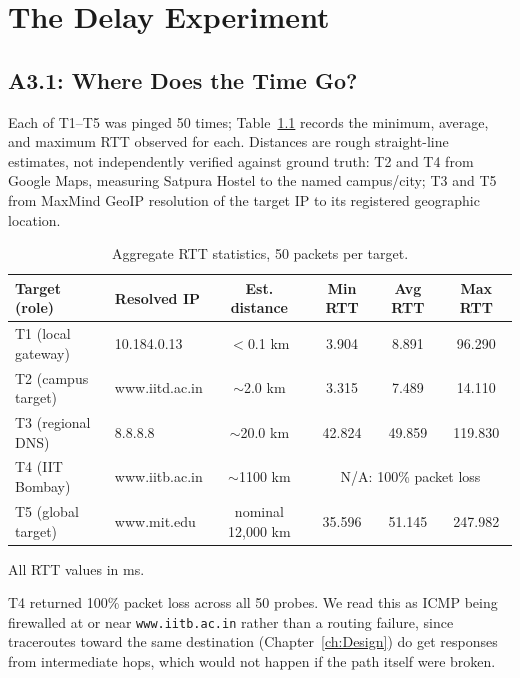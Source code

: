 \chapter{The Delay Experiment}\label{ch:Implementation}

\section{A3.1: Where Does the Time Go?}
Each of T1--T5 was pinged 50 times; Table~\ref{tab:rttstats} records the minimum, average, and
maximum RTT observed for each. Distances are rough straight-line estimates, not independently
verified against ground truth: T2 and T4 from Google Maps, measuring Satpura Hostel to the named
campus/city; T3 and T5 from MaxMind GeoIP resolution of the target IP to its registered
geographic location.

\begin{table}[H]
\centering
\caption{Aggregate RTT statistics, 50 packets per target.}
\label{tab:rttstats}
\footnotesize
\begin{tabular}{@{}p{2.6cm}p{2.6cm}cccc@{}}
\toprule
Target (role) & Resolved IP & Est. distance & Min RTT & Avg RTT & Max RTT \\
\midrule
T1 (local gateway)\footnotemark & 10.184.0.13 & $<$0.1 km & 3.904 & 8.891 & 96.290 \\
T2 (campus target) & www.iitd.ac.in & $\sim$2.0 km & 3.315 & 7.489 & 14.110 \\
T3 (regional DNS) & 8.8.8.8 & $\sim$20.0 km & 42.824 & 49.859 & 119.830 \\
T4 (IIT Bombay) & www.iitb.ac.in & $\sim$1100 km & \multicolumn{3}{c}{N/A: 100\% packet loss} \\
T5 (global target) & www.mit.edu & nominal 12{,}000 km & 35.596 & 51.145 & 247.982 \\
\bottomrule
\end{tabular}

{\footnotesize All RTT values in ms.}
\end{table}

T4 returned 100\% packet loss across all 50 probes. We read this as ICMP being firewalled at or
near \texttt{www.iitb.ac.in} rather than a routing failure, since traceroutes toward the same
destination (Chapter~\ref{ch:Design}) do get responses from intermediate hops, which would not
happen if the path itself were broken.

